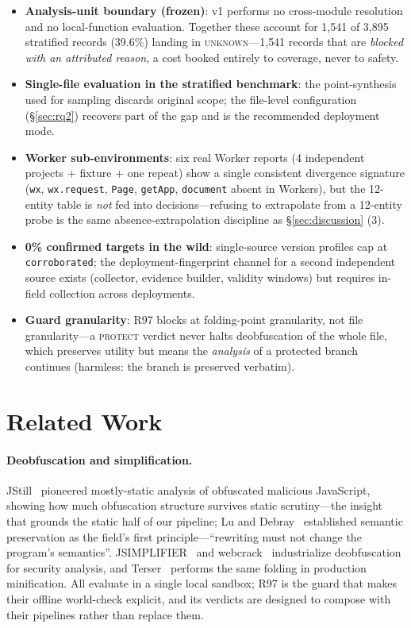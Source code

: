 \documentclass[sigconf,nonacm]{acmart}
\begin{document}
\begin{itemize}
  \item \textbf{Analysis-unit boundary (frozen)}: v1 performs no cross-module resolution and no local-function evaluation. Together these account for 1{,}541 of 3{,}895 stratified records (39.6\%) landing in \textsc{unknown}---1{,}541 records that are \emph{blocked with an attributed reason}, a cost booked entirely to coverage, never to safety.
  \item \textbf{Single-file evaluation in the stratified benchmark}: the point-synthesis used for sampling discards original scope; the file-level configuration (\S\ref{sec:rq2}) recovers part of the gap and is the recommended deployment mode.
  \item \textbf{Worker sub-environments}: six real Worker reports (4 independent projects $+$ fixture $+$ one repeat) show a single consistent divergence signature (\texttt{wx}, \texttt{wx.request}, \texttt{Page}, \texttt{getApp}, \texttt{document} absent in Workers), but the 12-entity table is \emph{not} fed into decisions---refusing to extrapolate from a 12-entity probe is the same absence-extrapolation discipline as \S\ref{sec:discussion} (3).
  \item \textbf{0\% confirmed targets in the wild}: single-source version profiles cap at \texttt{corroborated}; the deployment-fingerprint channel for a second independent source exists (collector, evidence builder, validity windows) but requires in-field collection across deployments.
  \item \textbf{Guard granularity}: R97 blocks at folding-point granularity, not file granularity---a \textsc{protect} verdict never halts deobfuscation of the whole file, which preserves utility but means the \emph{analysis} of a protected branch continues (harmless: the branch is preserved verbatim).
\end{itemize}

\section{Related Work}\label{sec:related}

\paragraph{Deobfuscation and simplification.} JStill~\cite{jstill} pioneered mostly-static analysis of obfuscated malicious JavaScript, showing how much obfuscation structure survives static scrutiny---the insight that grounds the static half of our pipeline; Lu and Debray~\cite{ludebray} established semantic preservation as the field's first principle---``rewriting must not change the program's semantics''. JSIMPLIFIER~\cite{jsimplifier} and webcrack~\cite{webcrack} industrialize deobfuscation for security analysis, and Terser~\cite{terser} performs the same folding in production minification. All evaluate in a single local sandbox; R97 is the guard that makes their offline world-check explicit, and its verdicts are designed to compose with their pipelines rather than replace them.
\end{document}
